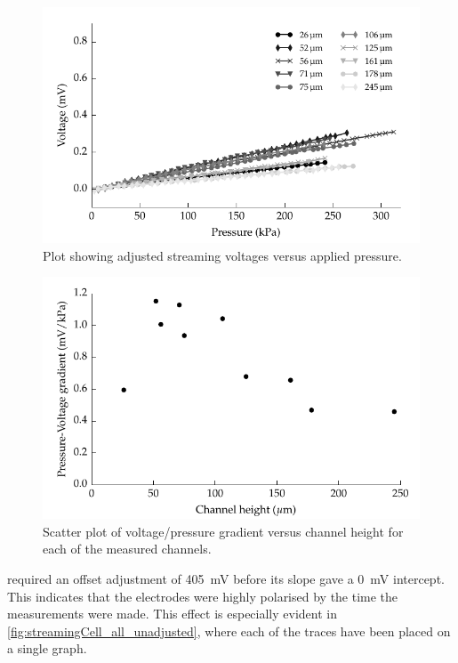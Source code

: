     \begin{figure}
        \centering
        \includegraphics{content/pt1/01-PowerHarvesting/graphics/graph_streamingVoltageGradient_vs_height}
        \caption{\label{fig:streamingCell_all_adjusted}Plot showing adjusted streaming voltages versus applied pressure.}
    \end{figure}

    \begin{figure}
        \centering
        \includegraphics{content/pt1/01-PowerHarvesting/graphics/streamingCell_slopeVsChannelHeight}
        \caption{\label{fig:streamingCell_scatter_voltGradVsHeight}Scatter plot of voltage/pressure gradient versus channel height for each of the measured channels.}
    \end{figure}

     required an offset adjustment of \SI{405}{\milli\volt} before its slope gave a \SI{0}{\milli\volt} intercept.
    This indicates that the electrodes were highly polarised by the time the measurements were made.
    This effect is especially evident in \cref{fig:streamingCell_all_unadjusted}, where each of the traces have been placed on a single graph.

